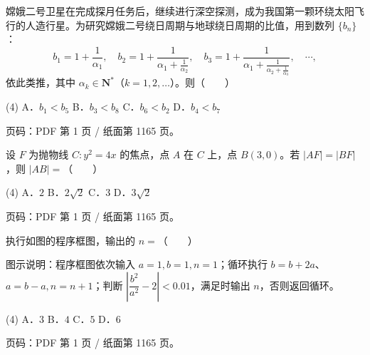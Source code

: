 \begin{question}
嫦娥二号卫星在完成探月任务后，继续进行深空探测，成为我国第一颗环绕太阳飞行的人造行星。为研究嫦娥二号绕日周期与地球绕日周期的比值，用到数列 $\{b_n\}$：
\nopagebreak[4]
\[
b_1=1+\frac1{\alpha_1},\quad
b_2=1+\frac1{\alpha_1+\frac1{\alpha_2}},\quad
b_3=1+\frac1{\alpha_1+\frac1{\alpha_2+\frac1{\alpha_3}}},\quad\cdots,
\]
依此类推，其中 $\alpha_k\in\mathbf N^*$（$k=1,2,\ldots$）。则\mbox{（　　）}

\begin{gkopts}(4)
\task A．$b_1<b_5$
\task B．$b_3<b_8$
\task C．$b_6<b_2$
\task D．$b_4<b_7$
\end{gkopts}

\begin{gktip}
页码：PDF 第 1 页 / 纸面第 1165 页。
\end{gktip}

\end{question}
\begin{question}
设 $F$ 为抛物线 $C:y^2=4x$ 的焦点，点 $A$ 在 $C$ 上，点 $B(3,0)$。若 $|AF|=|BF|$，则 $|AB|=$\mbox{（　　）}

\begin{gkopts}(4)
\task A．$2$
\task B．$2\sqrt2$
\task C．$3$
\task D．$3\sqrt2$
\end{gkopts}

\begin{gktip}
页码：PDF 第 1 页 / 纸面第 1165 页。
\end{gktip}

\Needspace{0.4\textheight}
\end{question}
\begin{question}
执行如图的程序框图，输出的 $n=$\mbox{（　　）}

\begin{gktip}
图示说明：程序框图依次输入 $a=1,b=1,n=1$；循环执行 $b=b+2a$、$a=b-a,n=n+1$；判断 $\left|\dfrac{b^2}{a^2}-2\right|<0.01$，满足时输出 $n$，否则返回循环。
\end{gktip}
\nopagebreak[4]
\begin{center}\end{center}
\nopagebreak[4]
\begin{gkopts}(4)
\task A．$3$
\task B．$4$
\task C．$5$
\task D．$6$
\end{gkopts}

\begin{gktip}
页码：PDF 第 1 页 / 纸面第 1165 页。
\end{gktip}

\end{question}
